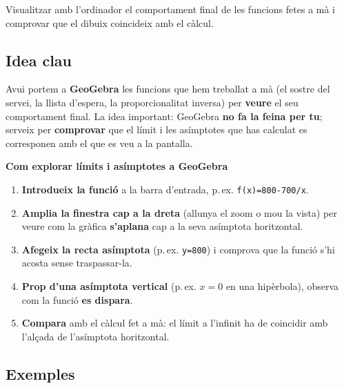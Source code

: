 %
{Visualitzar amb l'ordinador el comportament final de les funcions fetes a mà i comprovar que el dibuix coincideix amb el càlcul.}

\subsection{Idea clau}

Avui portem a \textbf{GeoGebra} les funcions que hem treballat a mà (el sostre del
servei, la llista d'espera, la proporcionalitat inversa) per \textbf{veure} el seu
comportament final. La idea important: GeoGebra \textbf{no fa la feina per tu};
serveix per \textbf{comprovar} que el límit i les asímptotes que has calculat es
corresponen amb el que es veu a la pantalla.

\begin{idea}
\textbf{Com explorar límits i asímptotes a GeoGebra}
\begin{enumerate}[leftmargin=1.6em, itemsep=2pt]
  \item \textbf{Introdueix la funció} a la barra d'entrada, p.\,ex.
        \texttt{f(x)=800-700/x}.
  \item \textbf{Amplia la finestra cap a la dreta} (allunya el zoom o mou la vista) per
        veure com la gràfica \textbf{s'aplana} cap a la seva asímptota horitzontal.
  \item \textbf{Afegeix la recta asímptota} (p.\,ex. \texttt{y=800}) i comprova que la
        funció s'hi acosta sense traspassar-la.
  \item \textbf{Prop d'una asímptota vertical} (p.\,ex. $x=0$ en una hipèrbola), observa
        com la funció \textbf{es dispara}.
  \item \textbf{Compara} amb el càlcul fet a mà: el límit a l'infinit ha de coincidir
        amb l'alçada de l'asímptota horitzontal.
\end{enumerate}
\end{idea}

\subsection{Exemples}

